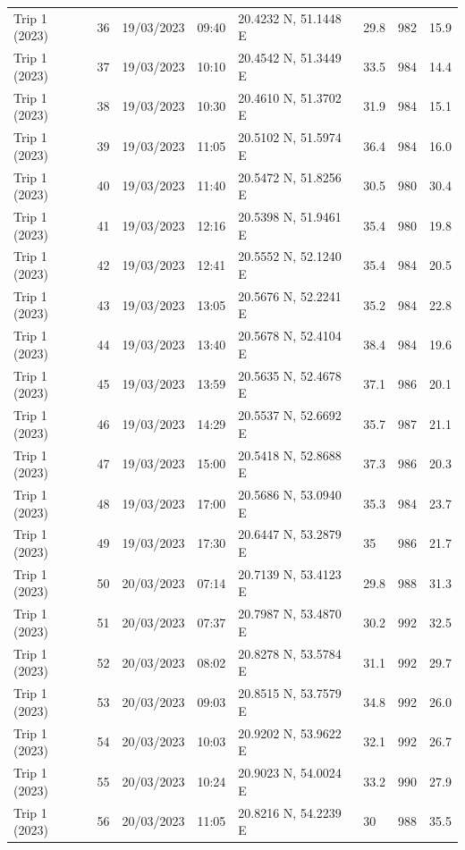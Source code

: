 \begin{scriptsize}
\begin{longtable}{llllllll}
Trip 1 (2023) & 36 & 19/03/2023 & 09:40 & 20.4232 N, 51.1448 E & 29.8 & 982 & 15.9 \\
Trip 1 (2023) & 37 & 19/03/2023 & 10:10 & 20.4542 N, 51.3449 E & 33.5 & 984 & 14.4 \\
Trip 1 (2023) & 38 & 19/03/2023 & 10:30 & 20.4610 N, 51.3702 E & 31.9 & 984 & 15.1 \\
Trip 1 (2023) & 39 & 19/03/2023 & 11:05 & 20.5102 N, 51.5974 E & 36.4 & 984 & 16.0 \\
Trip 1 (2023) & 40 & 19/03/2023 & 11:40 & 20.5472 N, 51.8256 E & 30.5 & 980 & 30.4 \\
Trip 1 (2023) & 41 & 19/03/2023 & 12:16 & 20.5398 N, 51.9461 E & 35.4 & 980 & 19.8 \\
Trip 1 (2023) & 42 & 19/03/2023 & 12:41 & 20.5552 N, 52.1240 E & 35.4 & 984 & 20.5 \\
Trip 1 (2023) & 43 & 19/03/2023 & 13:05 & 20.5676 N, 52.2241 E & 35.2 & 984 & 22.8 \\
Trip 1 (2023) & 44 & 19/03/2023 & 13:40 & 20.5678 N, 52.4104 E & 38.4 & 984 & 19.6 \\
Trip 1 (2023) & 45 & 19/03/2023 & 13:59 & 20.5635 N, 52.4678 E & 37.1 & 986 & 20.1 \\
Trip 1 (2023) & 46 & 19/03/2023 & 14:29 & 20.5537 N, 52.6692 E & 35.7 & 987 & 21.1 \\
Trip 1 (2023) & 47 & 19/03/2023 & 15:00 & 20.5418 N, 52.8688 E & 37.3 & 986 & 20.3 \\
Trip 1 (2023) & 48 & 19/03/2023 & 17:00 & 20.5686 N, 53.0940 E & 35.3 & 984 & 23.7 \\
Trip 1 (2023) & 49 & 19/03/2023 & 17:30 & 20.6447 N, 53.2879 E & 35 & 986 & 21.7 \\
Trip 1 (2023) & 50 & 20/03/2023 & 07:14 & 20.7139 N, 53.4123 E & 29.8 & 988 & 31.3 \\
Trip 1 (2023) & 51 & 20/03/2023 & 07:37 & 20.7987 N, 53.4870 E & 30.2 & 992 & 32.5 \\
Trip 1 (2023) & 52 & 20/03/2023 & 08:02 & 20.8278 N, 53.5784 E & 31.1 & 992 & 29.7 \\
Trip 1 (2023) & 53 & 20/03/2023 & 09:03 & 20.8515 N, 53.7579 E & 34.8 & 992 & 26.0 \\
Trip 1 (2023) & 54 & 20/03/2023 & 10:03 & 20.9202 N, 53.9622 E & 32.1 & 992 & 26.7 \\
Trip 1 (2023) & 55 & 20/03/2023 & 10:24 & 20.9023 N, 54.0024 E & 33.2 & 990 & 27.9 \\
Trip 1 (2023) & 56 & 20/03/2023 & 11:05 & 20.8216 N, 54.2239 E & 30 & 988 & 35.5 \\

\end{longtable}
\end{scriptsize}
